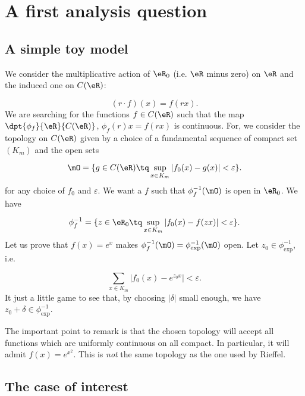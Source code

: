 \section{A first analysis question}

\subsection{A simple toy model}

We consider the multiplicative action of $\eR_0$ (i.e. $\eR$ minus zero) on $\eR$ and the induced one on $C(\eR)$:

\begin{equation}
(r\cdot f)(x)=f(rx).
\end{equation}
We are searching for the functions $f\in C(\eR)$ such that the map $\dpt{\phi_f}{\eR}{C(\eR)}$, $\phi_f(r)x=f(rx)$ is continuous. For, we consider the topology on $C(\eR)$ given by a choice of a fundamental sequence of compact set $(K_m)$ and the open sets 

\[ 
  \mO=\{ g\in C(\eR)\tq \sup_{x\in K_m}| f_0(x)-g(x) |<\varepsilon \}.
\]
for any choice of $f_0$ and $\varepsilon$. We want a $f$ such that $\phi_f^{-1}(\mO)$ is open in $\eR_0$. We have

\begin{equation}
\phi^{-1}_f=\{ z\in\eR_0\tq \sup_{x\in K_m}| f_0(x)-f(zx) |<\varepsilon \}.
\end{equation}
Let us prove that $f(x)=e^x$ makes $\phi_f^{-1}(\mO)=\phi_{\exp}^{-1}(\mO)$ open. Let $z_0\in \phi^{-1}_{\exp}$, i.e.

\[ 
  \sum_{x\in K_m}| f_0(x)-e^{z_0x} |<\varepsilon.
\]
It just a little game to see that, by choosing $| \delta |$ small enough, we have $z_0+\delta\in\phi_{\exp}^{-1}$.
 
The important point to remark is that the chosen topology will accept all functions which are uniformly continuous on all compact. In particular, it will admit $f(x)=e^{x^2}$. This is \emph{not} the same topology as the one used by Rieffel.


\subsection{The case of interest}

